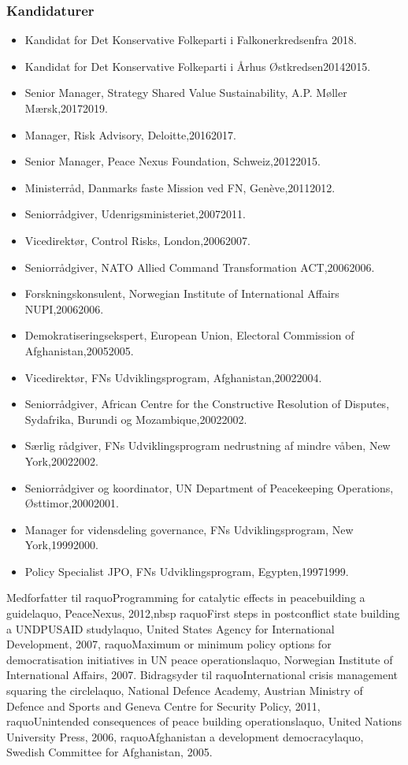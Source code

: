 \documentclass[11pt, a4paper]{awesome-cv}
\begin{document}
\begin{cvletter}
\subsubsection*{Kandidaturer}
\begin{itemize}
\item Kandidat for Det Konservative Folkeparti i Falkonerkredsenfra 2018.
\item Kandidat for Det Konservative Folkeparti i Århus Østkredsen20142015.
\end{itemize}
\begin{itemize}
\item Senior Manager, Strategy  Shared Value Sustainability, A.P. Møller Mærsk,20172019.
\item Manager, Risk Advisory, Deloitte,20162017.
\item Senior Manager, Peace Nexus Foundation, Schweiz,20122015.
\item Ministerråd, Danmarks faste Mission ved FN, Genève,20112012.
\item Seniorrådgiver, Udenrigsministeriet,20072011.
\item Vicedirektør, Control Risks, London,20062007.
\item Seniorrådgiver, NATO Allied Command Transformation ACT,20062006.
\item Forskningskonsulent, Norwegian Institute of International Affairs NUPI,20062006.
\item Demokratiseringsekspert, European Union, Electoral Commission of Afghanistan,20052005.
\item Vicedirektør, FNs Udviklingsprogram, Afghanistan,20022004.
\item Seniorrådgiver, African Centre for the Constructive Resolution of Disputes, Sydafrika, Burundi og Mozambique,20022002.
\item Særlig rådgiver, FNs Udviklingsprogram nedrustning af mindre våben, New York,20022002.
\item Seniorrådgiver og koordinator, UN Department of Peacekeeping Operations, Østtimor,20002001.
\item Manager for vidensdeling governance, FNs Udviklingsprogram, New York,19992000.
\item Policy Specialist JPO, FNs Udviklingsprogram, Egypten,19971999.
\end{itemize}
Medforfatter til raquoProgramming for catalytic effects in peacebuilding  a guidelaquo, PeaceNexus, 2012,nbsp raquoFirst steps in postconflict state building a UNDPUSAID studylaquo, United States Agency for International Development, 2007, raquoMaximum or minimum policy options for democratisation initiatives in UN peace operationslaquo, Norwegian Institute of International Affairs, 2007. Bidragsyder til raquoInternational crisis management squaring the circlelaquo, National Defence Academy, Austrian Ministry of Defence and Sports and Geneva Centre for Security Policy, 2011, raquoUnintended consequences of peace building operationslaquo, United Nations University Press, 2006, raquoAfghanistan  a development democracylaquo, Swedish Committee for Afghanistan, 2005.

\end{cvletter}
\end{document}
